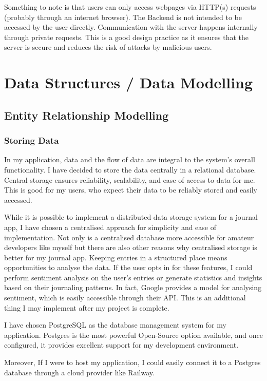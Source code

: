 Something to note is that users can only access webpages via HTTP(s) requests (probably through an internet browser). The Backend is not intended to be accessed by the user directly. Communication with the server happens internally through private requests. This is a good design practice as it ensures that the server is secure and reduces the risk of attacks by malicious users. 


\section{Data Structures / Data Modelling}
\subsection{Entity Relationship Modelling}
\subsubsection{Storing Data}
In my application, data and the flow of data are integral to the system's overall functionality. I have decided to store the data centrally in a relational database. Central storage ensures reliability, scalability, and ease of access to data for me. This is good for my users, who expect their data to be reliably stored and easily accessed.

While it is possible to implement a distributed data storage system for a journal app, I have chosen a centralised approach for simplicity and ease of implementation. Not only is a centralised database more accessible for amateur developers like myself but there are also other reasons why centralised storage is better for my journal app. Keeping entries in a structured place means opportunities to analyse the data. If the user opts in for these features, I could perform sentiment analysis on the user's entries or generate statistics and insights based on their journaling patterns. In fact, Google provides a model for analysing sentiment, which is easily accessible through their API. This is an additional thing I may implement after my project is complete.

I have chosen PostgreSQL as the database management system for my application. Postgres is the most powerful Open-Source option available, and once configured, it provides excellent support for my development environment.

Moreover, If I were to host my application, I could easily connect it to a Postgres database through a cloud provider like Railway.

